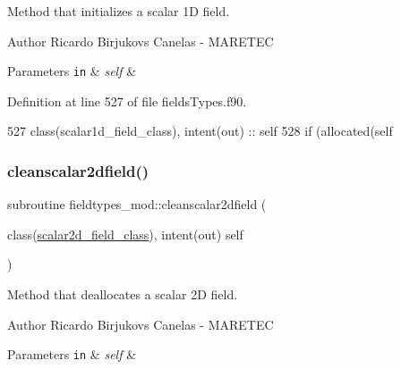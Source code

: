 Method that initializes a scalar 1D field. 

\begin{DoxyAuthor}{Author}
Ricardo Birjukovs Canelas -\/ M\+A\+R\+E\+T\+EC 
\end{DoxyAuthor}

\begin{DoxyParams}[1]{Parameters}
\mbox{\tt in}  & {\em self} & \\
\hline
\end{DoxyParams}


Definition at line 527 of file fields\+Types.\+f90.


\begin{DoxyCode}
527     \textcolor{keywordtype}{class}(scalar1d\_field\_class), \textcolor{keywordtype}{intent(out)} :: self
528     \textcolor{keywordflow}{if} (\textcolor{keyword}{allocated}(self%
\end{DoxyCode}
\mbox{\label{namespacefieldtypes__mod_a26a4170db6067cf4ba85099f9701ff4c}} 
\subsubsection{\texorpdfstring{cleanscalar2dfield()}{cleanscalar2dfield()}}
{\footnotesize\ttfamily subroutine fieldtypes\+\_\+mod\+::cleanscalar2dfield (\begin{DoxyParamCaption}\item[{class(\mbox{\hyperlink{structfieldtypes__mod_1_1scalar2d__field__class}{scalar2d\+\_\+field\+\_\+class}}), intent(out)}]{self }\end{DoxyParamCaption})\hspace{0.3cm}{\ttfamily [private]}}



Method that deallocates a scalar 2D field. 

\begin{DoxyAuthor}{Author}
Ricardo Birjukovs Canelas -\/ M\+A\+R\+E\+T\+EC 
\end{DoxyAuthor}

\begin{DoxyParams}[1]{Parameters}
\mbox{\tt in}  & {\em self} & \\
\hline
\end{DoxyParams}



